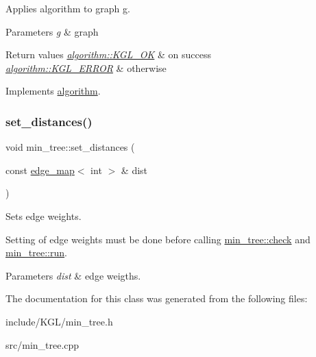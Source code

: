 Applies algorithm to graph g. 


\begin{DoxyParams}{Parameters}
{\em g} & graph \\
\hline
\end{DoxyParams}

\begin{DoxyRetVals}{Return values}
{\em \mbox{\hyperlink{classalgorithm_af1a0078e153aa99c24f9bdf0d97f6710aae4c1cd7fe8d8cf4b143241a6e7c31cf}{algorithm\+::\+K\+G\+L\+\_\+\+OK}}} & on success \\
\hline
{\em \mbox{\hyperlink{classalgorithm_af1a0078e153aa99c24f9bdf0d97f6710ae67bf27b2ef31f73e545a7f9f4a69556}{algorithm\+::\+K\+G\+L\+\_\+\+E\+R\+R\+OR}}} & otherwise \\
\hline
\end{DoxyRetVals}


Implements \mbox{\hyperlink{classalgorithm_a734b189509a8d6b56b65f8ff772d43ca}{algorithm}}.

\mbox{\label{classmin__tree_a0f3eb1714b7859576037cf4b991b16cb}} 
\subsubsection{\texorpdfstring{set\+\_\+distances()}{set\_distances()}}
{\footnotesize\ttfamily void min\+\_\+tree\+::set\+\_\+distances (\begin{DoxyParamCaption}\item[{const \mbox{\hyperlink{classedge__map}{edge\+\_\+map}}$<$ int $>$ \&}]{dist }\end{DoxyParamCaption})}



Sets edge weights. 

Setting of edge weights must be done before calling \mbox{\hyperlink{classmin__tree_ad87b1bfbc687ad943c07538fa0c3d270}{min\+\_\+tree\+::check}} and \mbox{\hyperlink{classmin__tree_ac025e8dad0db7a6a1e0e7b476b547802}{min\+\_\+tree\+::run}}.


\begin{DoxyParams}{Parameters}
{\em dist} & edge weigths. \\
\hline
\end{DoxyParams}


The documentation for this class was generated from the following files\+:\begin{DoxyCompactItemize}
\item 
include/\+K\+G\+L/min\+\_\+tree.\+h\item 
src/min\+\_\+tree.\+cpp\end{DoxyCompactItemize}
